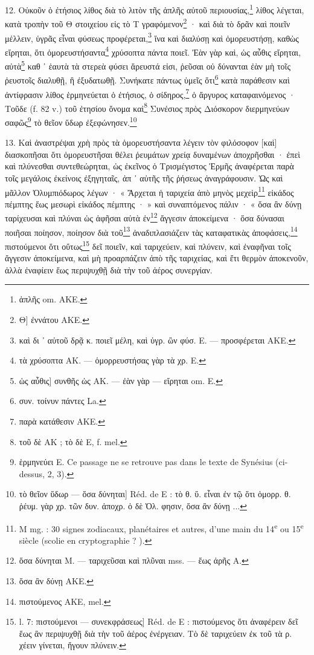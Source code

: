 \documentclass[a4paper, 11pt, oneside, polutonikogreek, french]{article}
\begin{document}
12. Οὐκοῦν ὁ ἐτήσιος λίθος διὰ τὸ λιτὸν τῆς ἁπλῆς αὐτοῦ περιουσίας,\footnote{ἁπλῆς om. AKE.} λίθος λέγεται, κατὰ τροπὴν τοῦ Θ στοιχείου εἰς τὸ Τ γραφόμενον\footnote{Θ] ἐννάτου AKE.} · καὶ διὰ τὸ δρᾶν καὶ ποιεῖν μέλλειν, ὑγρᾶς εἶναι φύσεως προφέρεται,\footnote{καὶ δι ᾽ αὐτοῦ δρᾷ κ. ποιεῖ μέλη, καὶ ὑγρ. ὢν φύσ. E. --- προσφέρεται AKE.} ἵνα καὶ διαλύσῃ καὶ ὁμορευστήσῃ, καθὼς εἴρηται, ὅτι ὁμορευστήσαντα\footnote{τὰ χρύσοπτα AK. --- ὁμορρευστήσας γὰρ τὰ χρ. E.} χρύσοπτα πάντα ποιεῖ. Ἐὰν γὰρ καὶ, ὡς αὖθις εἴρηται, αὐτὰ\footnote{ὡς αὖθις] συνθῆς ὡς AΚ. --- ἐὰν γὰρ --- εἴρηται om. E.} καθ ᾽ ἑαυτὰ τὰ στερεὰ φύσει ἄρευστά εἰσι, ῥεῦσαι οὐ δύνανται ἐὰν μὴ τοῖς ῥευστοῖς διαλυθῇ, ἢ ἐξυδατωθῇ. Συνήκατε πάντως ὑμεῖς ὅτι\footnote{συν. τοίνυν πάντες La.} κατὰ παράθεσιν καὶ ἀντίφρασιν λίθος ἑρμηνεύεται ὁ ἐτήσιος, ὁ σίδηρος,\footnote{παρὰ κατάθεσιν AΚE.} ὁ ἄργυρος καταφαινόμενος · Τοῦδε (f. 82 v.) τοῦ ἐτησίου ὄνομα καὶ\footnote{τοῦ δὲ AK ; τὸ δὲ E, f. mel.} Συνέσιος πρὸς Διόσκορον διερμηνεύων σαφῶς\footnote{ἑρμηνεύει E. Ce passage ne se retrouve pas dans le texte de Synésius (ci-dessus, 2, 3).} τὸ θεῖον ὕδωρ ἐξεφώνησεν.\footnote{τὸ θεῖον ὕδωρ --- ὅσα δύνηται] Réd. de E : τὸ θ. ὕ. εἶναι ἐν τῷ ὅτι ὁμορρ. θ. ῥέυμ. γὰρ χρ. τῶν δυν. ἀποχρ. ὁ δὲ Ὁλ. φησιν, ὅσα ἂν δύνῃ ...}

13. Καὶ ἀναστρέψαι χρὴ πρὸς τὰ ὁμορευστήσαντα λέγειν τὸν φιλόσοφον [καὶ] διασκοπῆσαι ὅτι ὁμορευστῆσαι θέλει ῥευμάτων χρείᾳ δυναμένων ἀποχρῆσθαι · ἐπεὶ καὶ πλύνεσθαι συντεθεώρηται, ὡς ἐκεῖνος ὁ Τρισμέγιστος Ἑρμῆς ἀναφέρεται παρὰ τοῖς μεγάλοις ἐκείνοις ἐξηγηταῖς, ἀπ ᾽ αὐτῆς τῆς ῥήσεως ἀναγράφουσιν. Ὡς καὶ μᾶλλον Ὀλυμπιόδωρος λέγων · « Ἄρχεται ἡ ταριχεία ἀπὸ μηνὸς μεχεὶρ\footnote{M mg. : 30 signes zodiacaux, planétaires et autres, d'une main du 14\textsuperscript{e} ou 15\textsuperscript{e} siècle (scolie en cryptographie ? ).} εἰκάδος πέμπτης ἕως μεσωρὶ εἰκάδος πέμπτης · » καὶ συναπτόμενος πάλιν · « ὅσα ἂν δύνῃ ταρίχευσαι καὶ πλύναι ὡς ἀφῆσαι αὐτὰ ἐν\footnote{ὅσα δύνηται M. --- ταριχεῦσαι καὶ πλῦναι mss. --- ἕως ἀρῆς A.} ἄγγεσιν ἀποκείμενα · ὅσα δύνασαι ποιῆσαι ποίησον, ποίησον διὰ τοῦ\footnote{ὅσα ἂν δύνῃ AKE.} ἀναδιπλασιάζειν τὰς καταφατικὰς ἀποφάσεις,\footnote{πιστούμενος AKE, mel.} πιστούμενοι ὅτι οὕτως\footnote{l. 7: πιστούμενοι --- συνεκφράσεως] Réd. de E : πιστούμενος ὅτι ἀναφέρειν δεῖ ἕως ἂν περιψυχθῇ διὰ τὴν τοῦ ἀέρος ἐνέργειαν. Τὸ δὲ ταριχεύειν ἐκ τοῦ τὰ ρ. χέειν γίνεται, ἤγουν πλύνειν.} δεῖ ποιεῖν, καὶ ταριχεύειν, καὶ πλύνειν, καὶ ἐναφῆναι τοῖς ἄγγεσιν ἀποκείμενα, καὶ μὴ προαρπάζειν ἀπὸ τῆς ταριχείας, καὶ ἔτι θερμὸν ἀποκενοῦν, ἀλλὰ ἐναφίειν ἕως περιψυχθῇ διὰ τὴν τοῦ ἀέρος συνεργίαν.
\end{document}

